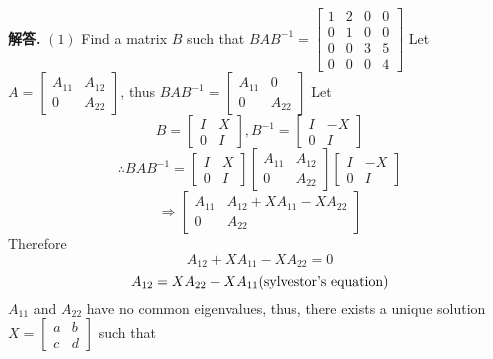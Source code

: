 \documentclass[10pt, a4paper, oneside]{article}
\newenvironment{solution}{\par\noindent\textbf{解答. }}{\par}
\begin{document}
\begin{CJK}{UTF8}{gbsn}
\begin{solution} \newline
    $(1)$ Find a matrix $B$ such that $BAB^{-1} = \begin{bmatrix}
      1 & 2 & 0 & 0 \\ 
      0 & 1 & 0 & 0 \\
      0 & 0 & 3 & 5 \\
      0 & 0 & 0 & 4
    \end{bmatrix}$ \newline
    Let $A = \begin{bmatrix}
      A_{11} & A_{12} \\ 
      0 & A_{22}
    \end{bmatrix}$, thus $BAB^{-1} = \begin{bmatrix}
      A_{11} & 0 \\ 
      0 & A_{22}
    \end{bmatrix}$ \newline Let
    $$ B = \begin{bmatrix}
      I & X \\ 0 & I 
    \end{bmatrix}, B^{-1} = \begin{bmatrix}
      I & -X \\ 0 & I 
    \end{bmatrix}$$
    $$\therefore BAB^{-1} = \begin{bmatrix}
      I & X \\ 0 & I 
    \end{bmatrix} \begin{bmatrix}
      A_{11} & A_{12} \\ 
      0 & A_{22}
    \end{bmatrix} \begin{bmatrix}
      I & -X \\ 0 & I 
    \end{bmatrix} $$ 
    $$ \Rightarrow \begin{bmatrix}
      A_{11} & A_{12} + XA_{11} - XA_{22} \\ 0 & A_{22}
    \end{bmatrix}$$ Therefore
    $$ A_{12} + XA_{11} - XA_{22} = 0$$
    $$ A_{12} = XA_{22} - XA_{11} \space \text{(sylvestor's equation)}$$
    $A_{11}$ and $A_{22}$ have no common eigenvalues, thus, there exists a unique solution $X = \begin{bmatrix}
      a & b \\ c & d
    \end{bmatrix}$ such that 

\end{solution}
\end{CJK}
\end{document}

